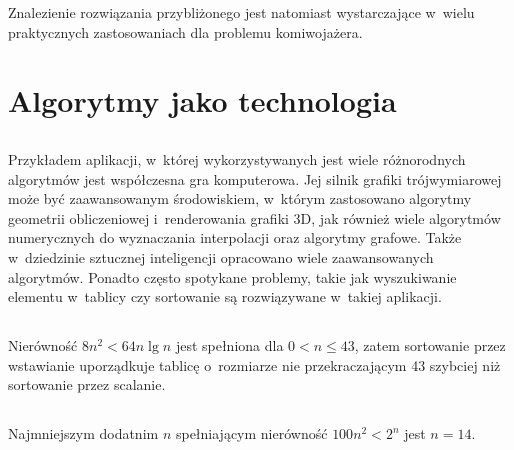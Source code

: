 Znalezienie rozwiązania przybliżonego jest natomiast wystarczające w~wielu praktycznych zastosowaniach dla problemu komiwojażera.

\section{Algorytmy jako technologia}

\subsection{} %
Przykładem aplikacji, w~której wykorzystywanych jest wiele różnorodnych algorytmów jest współczesna gra komputerowa. Jej silnik grafiki trójwymiarowej może być zaawansowanym środowiskiem, w~którym zastosowano algorytmy geometrii obliczeniowej i~renderowania grafiki 3D, jak również wiele algorytmów numerycznych do wyznaczania interpolacji oraz algorytmy grafowe. Także w~dziedzinie sztucznej inteligencji opracowano wiele zaawansowanych algorytmów. Ponadto często spotykane problemy, takie jak wyszukiwanie elementu w~tablicy czy sortowanie są rozwiązywane w~takiej aplikacji.

\subsection{} %
Nierówność $8n^2<64n\lg n$ jest spełniona dla $0<n\le43$, zatem sortowanie przez wstawianie uporządkuje tablicę o~rozmiarze nie przekraczającym 43 szybciej niż sortowanie przez scalanie.

\subsection{} %
Najmniejszym dodatnim $n$ spełniającym nierówność $100n^2<2^n$ jest $n=14$.

\problems

\subsection{} %

